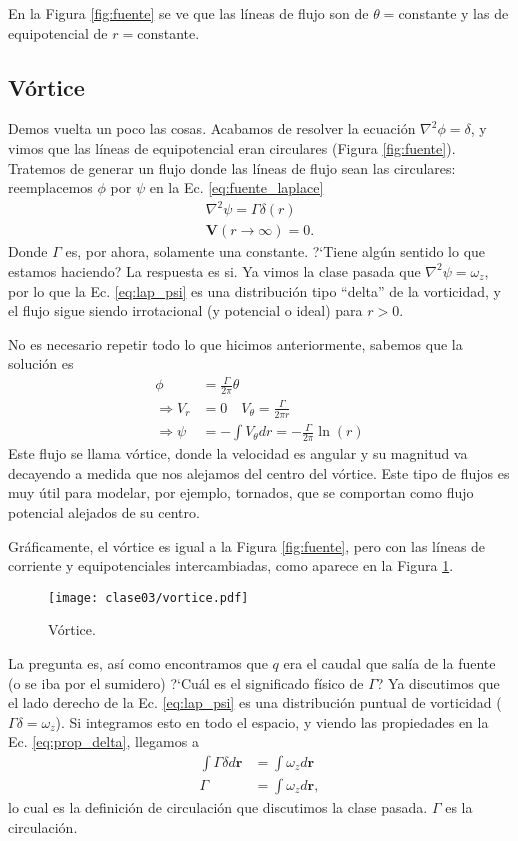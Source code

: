 En la Figura \ref{fig:fuente} se ve que las líneas de flujo son de $\theta=$constante y las de equipotencial de $r=$constante.

\subsection*{Vórtice}
Demos vuelta un poco las cosas.
Acabamos de resolver la ecuación $\nabla^2\phi=\delta$, y vimos que las líneas de equipotencial eran circulares (Figura \ref{fig:fuente}).
Tratemos de generar un flujo donde las líneas de flujo sean las circulares: reemplacemos $\phi$ por $\psi$ en la Ec. \eqref{eq:fuente_laplace}
%
\begin{align}\label{eq:lap_psi}
\nabla^2\psi=\Gamma\delta(r)\nonumber\\
\mathbf{V}(r\to\infty)=0.
\end{align}
%
Donde $\Gamma$ es, por ahora, solamente una constante.
\mbox{?`}Tiene algún sentido lo que estamos haciendo? La respuesta es si.
Ya vimos la clase pasada que $\nabla^2\psi=\omega_z$, por lo que la Ec. \eqref{eq:lap_psi} es una distribución tipo ``delta'' de la vorticidad, y el flujo sigue siendo irrotacional (y potencial o ideal) para $r>0$.

No es necesario repetir todo lo que hicimos anteriormente, sabemos que la solución es 
%
\begin{align}
\phi&=\frac{\Gamma}{2\pi}\theta \nonumber\\
\Rightarrow V_r &= 0 \quad V_\theta=\frac{\Gamma}{2\pi r}\nonumber\\
\Rightarrow \psi &= -\int V_\theta dr = -\frac{\Gamma}{2\pi}\ln(r)
\end{align}
%
Este flujo se llama vórtice, donde la velocidad es angular y su magnitud va decayendo a medida que nos alejamos del centro del vórtice.
Este tipo de flujos es muy útil para modelar, por ejemplo, tornados, que se comportan como flujo potencial alejados de su centro.

Gráficamente, el vórtice es igual a la Figura \ref{fig:fuente}, pero con las líneas de corriente y equipotenciales intercambiadas, como aparece en la Figura \ref{fig:vortice}.

\begin{figure}[h!]
\centering
\texttt{[image: clase03/vortice.pdf]}
\caption{Vórtice.}
\label{fig:vortice}
\end{figure}

La pregunta es, así como encontramos que $q$ era el caudal que salía de la fuente (o se iba por el sumidero) \mbox{?`}Cuál es el significado físico de $\Gamma$?
Ya discutimos que el lado derecho de la Ec. \eqref{eq:lap_psi} es una distribución puntual de vorticidad ($\Gamma\delta=\omega_z$).
Si integramos esto en todo el espacio, y viendo las propiedades en la Ec. \eqref{eq:prop_delta}, llegamos a
%
\begin{align}
\int\Gamma\delta d\mathbf{r} &= \int\omega_z d\mathbf{r}\nonumber\\
\Gamma &= \int\omega_z d\mathbf{r},
\end{align}
%
lo cual es la definición de circulación que discutimos la clase pasada.
$\Gamma$ es la circulación.

